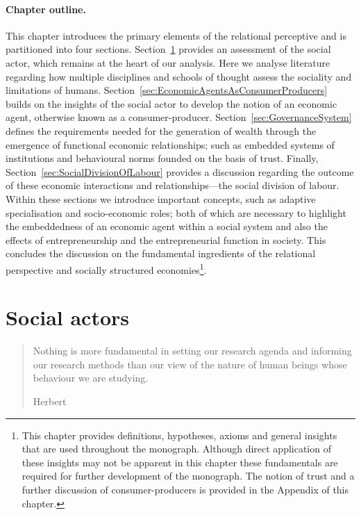 \paragraph{Chapter outline.}

This chapter introduces the primary elements of the relational perceptive and is partitioned into four sections. Section~\ref{sec:SocalActors} provides an assessment of the social actor, which remains at the heart of our analysis. Here we analyse literature regarding how multiple disciplines and schools of thought assess the sociality and limitations of humans. Section~\ref{sec:EconomicAgentsAsConsumerProducers} builds on the insights of the social actor to develop the notion of an economic agent, otherwise known as a consumer-producer. Section~\ref{sec:GovernanceSystem} defines the requirements needed for the generation of wealth through the emergence of functional economic relationships; such as embedded systems of institutions and behavioural norms founded on the basis of trust. Finally, Section~\ref{sec:SocialDivisionOfLabour} provides a discussion regarding the outcome of these economic interactions and relationships---the social division of labour. Within these sections we introduce important concepts, such as adaptive specialisation and socio-economic roles; both of which are necessary to highlight the embeddedness of an economic agent within a social system and also the effects of entrepreneurship and the entrepreneurial function in society. This concludes the discussion on the fundamental ingredients of the relational perspective and socially structured economies\footnote{This chapter provides definitions, hypotheses, axioms and general insights that are used throughout the monograph. Although direct application of these insights may not be apparent in this chapter these fundamentals are required for further development of the monograph. The notion of trust and a further discussion of consumer-producers is provided in the Appendix of this chapter.}.

\section{Social actors}
\label{sec:SocalActors}

\begin{quote}
Nothing is more fundamental in setting our research agenda and informing our research methods than our view of the nature of human beings whose behaviour we are studying.

\begin{flushright}
Herbert \citet[p.~303]{Simon1985}
\end{flushright}
\end{quote}

